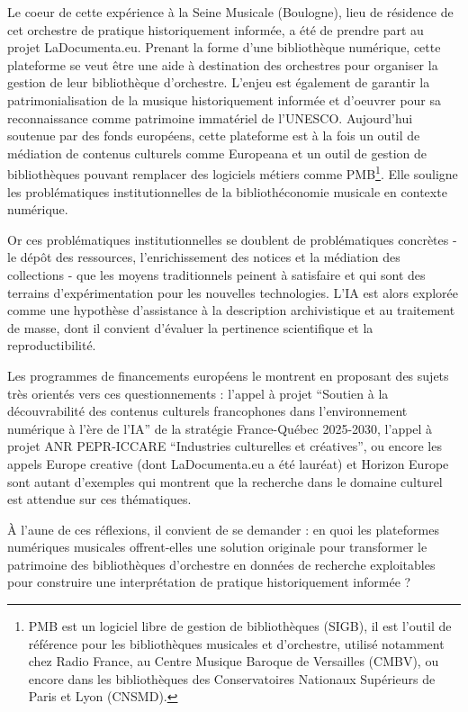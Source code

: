 \bigskip Le coeur de cette expérience à la Seine Musicale (Boulogne), lieu de résidence de cet orchestre de pratique historiquement informée, a été de prendre part au projet LaDocumenta.eu. Prenant la forme d'une bibliothèque numérique, cette plateforme se veut être une aide à destination des orchestres pour organiser la gestion de leur bibliothèque d'orchestre. L'enjeu est également de garantir la patrimonialisation de la musique historiquement informée et d'oeuvrer pour sa reconnaissance comme patrimoine immatériel de l'UNESCO. Aujourd'hui soutenue par des fonds européens, cette plateforme est à la fois un outil de médiation de contenus culturels comme Europeana et un outil de gestion de bibliothèques pouvant remplacer des logiciels métiers comme PMB\footnote{PMB est un logiciel libre de gestion de bibliothèques (SIGB), il est l'outil de référence pour les bibliothèques musicales et d'orchestre, utilisé notamment chez Radio France, au Centre Musique Baroque de Versailles (CMBV), ou encore dans les bibliothèques des Conservatoires Nationaux Supérieurs de Paris et Lyon (CNSMD).}. Elle souligne les problématiques institutionnelles de la bibliothéconomie musicale en contexte numérique.

\bigskip Or ces problématiques institutionnelles se doublent de problématiques concrètes - le dépôt des ressources, l'enrichissement des notices et la médiation des collections - que les moyens traditionnels peinent à satisfaire et qui sont des terrains d'expérimentation pour les nouvelles technologies. L'IA est alors explorée comme une hypothèse d'assistance à la description archivistique et au traitement de masse, dont il convient d'évaluer la pertinence scientifique et la reproductibilité.

\smallskip\indent Les programmes de financements européens le montrent en proposant des sujets très orientés vers ces questionnements : l'appel à projet \enquote{Soutien à la découvrabilité des contenus culturels francophones dans l’environnement numérique à l’ère de l’IA} de la stratégie France-Québec 2025-2030, l'appel à projet ANR PEPR-ICCARE \enquote{Industries culturelles et créatives}, ou encore les appels Europe creative (dont LaDocumenta.eu a été lauréat) et Horizon Europe sont autant d'exemples qui montrent que la recherche dans le domaine culturel est attendue sur ces thématiques.

\bigskip À l'aune de ces réflexions, il convient de se demander : en quoi les plateformes numériques musicales offrent-elles une solution originale pour transformer le patrimoine des bibliothèques d'orchestre en données de recherche exploitables pour construire une interprétation de pratique historiquement informée ?

